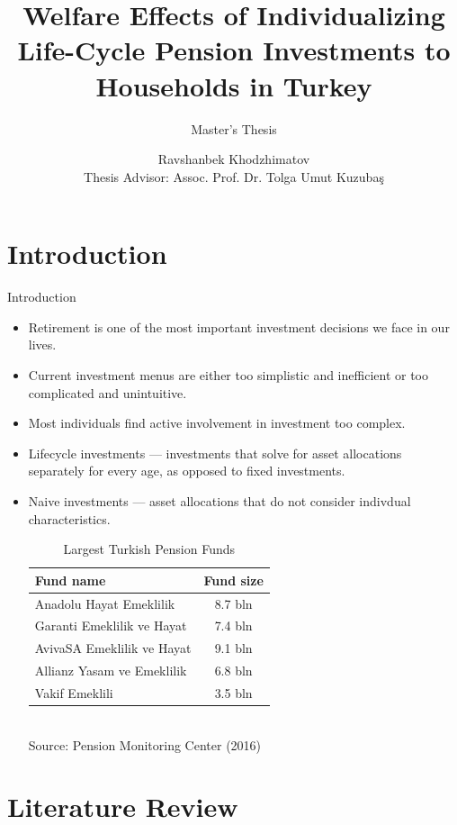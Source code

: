 \documentclass{beamer}
\author{Ravshanbek Khodzhimatov \\Thesis Advisor: Assoc. Prof. Dr. Tolga Umut Kuzuba\c{s}}
\title{Welfare Effects of Individualizing Life-Cycle Pension Investments to Households in Turkey}
\subtitle{Master's Thesis}
\begin{document}
\begin{frame}
\titlepage
\end{frame}

\section{Introduction}

\begin{frame}[allowframebreaks]{Introduction}
  \begin{itemize}
	\item Retirement is one of the most important investment decisions we face in our lives.
	\item Current investment menus are either too simplistic and inefficient or too complicated and unintuitive.
	\item Most individuals find active involvement in investment too complex.
	\item Lifecycle investments --- investments that solve for asset allocations separately for every age, as opposed to fixed investments.
	\item Naive investments --- asset allocations that do not consider indivdual characteristics. 

\framebreak

\begin{table}
	\centering
	\caption{Largest Turkish Pension Funds}
	\begin{tabular}[H]{lc}
		\hline
		Fund name&Fund size\\
		\hline
		Anadolu Hayat Emeklilik&8.7 bln\\
		Garanti Emeklilik ve Hayat&7.4 bln\\
		AvivaSA Emeklilik ve Hayat&9.1 bln\\
		Allianz Yasam ve Emeklilik&6.8 bln\\
		Vakif Emeklili&3.5 bln\\
		\hline
	\end{tabular}\\
	Source: Pension Monitoring Center (2016)
\end{table}
	
  \end{itemize}
\end{frame}


\section{Literature Review}
\end{document}
